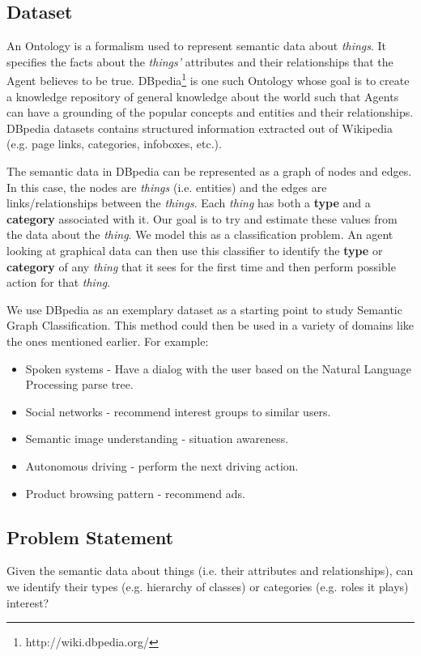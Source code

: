 \documentclass[runningheads,a4paper]{llncs}
\begin{document}
\subsection{Dataset}
An Ontology is a formalism used to represent semantic data about \textit{things}. It specifies the facts
about the \textit{things'} attributes and their relationships that the Agent believes to
be true. DBpedia\footnote{http://wiki.dbpedia.org/} is one such Ontology whose 
goal is to create a knowledge repository of general knowledge about the world 
such that Agents can have a grounding of the popular concepts and entities and 
their relationships. DBpedia datasets contains structured information extracted 
out of Wikipedia (e.g. page links, categories, infoboxes, etc.)\cite{dbpedia-swj}.

The semantic data in DBpedia can be represented as a graph of nodes and edges.
In this case, the nodes are \textit{things} (i.e. entities) and the edges are links/relationships between the
\textit{things}. Each \textit{thing} has both a \textbf{type} and a \textbf{category} associated with it.
Our goal is to try and estimate these values from the data about the \textit{thing}. 
We model this as a classification problem. An agent looking at graphical data 
can then use this classifier to identify the \textbf{type} or \textbf{category} of any \textit{thing} 
that it sees for the first time and then perform possible action for that \textit{thing}. 

We use DBpedia as an exemplary dataset as a starting point to study Semantic Graph Classification. 
This method could then be used in a variety of domains like the ones mentioned earlier. For example:
\begin{itemize}
\item Spoken systems - Have a dialog with the user based on the Natural Language Processing parse
tree.
\item Social networks - recommend interest groups to similar users.
\item Semantic image understanding - situation awareness.
\item Autonomous driving - perform the next driving action.
\item Product browsing pattern - recommend ads.
\end{itemize}

\subsection{Problem Statement}
Given the semantic data about things (i.e. their attributes and relationships),
can we identify their types (e.g. hierarchy of classes) or categories (e.g. roles it
plays) interest?
\end{document}

